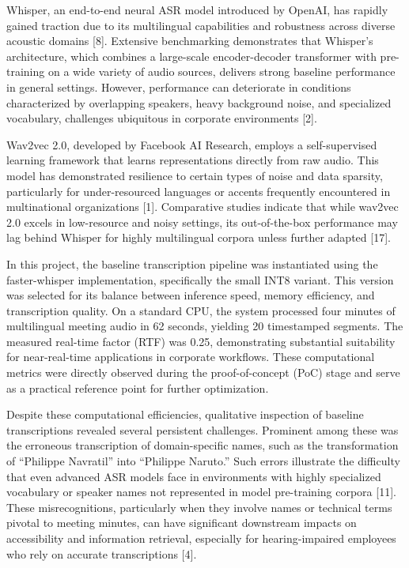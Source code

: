 \documentclass[12pt,a4paper]{article}
\begin{document}
Whisper, an end-to-end neural ASR model introduced by OpenAI, has rapidly gained traction due to its multilingual capabilities and robustness across diverse acoustic domains [8]. Extensive benchmarking demonstrates that Whisper’s architecture, which combines a large-scale encoder-decoder transformer with pre-training on a wide variety of audio sources, delivers strong baseline performance in general settings. However, performance can deteriorate in conditions characterized by overlapping speakers, heavy background noise, and specialized vocabulary, challenges ubiquitous in corporate environments [2].


Wav2vec 2.0, developed by Facebook AI Research, employs a self-supervised learning framework that learns representations directly from raw audio. This model has demonstrated resilience to certain types of noise and data sparsity, particularly for under-resourced languages or accents frequently encountered in multinational organizations [1]. Comparative studies indicate that while wav2vec 2.0 excels in low-resource and noisy settings, its out-of-the-box performance may lag behind Whisper for highly multilingual corpora unless further adapted [17].


In this project, the baseline transcription pipeline was instantiated using the faster-whisper implementation, specifically the small INT8 variant. This version was selected for its balance between inference speed, memory efficiency, and transcription quality. On a standard CPU, the system processed four minutes of multilingual meeting audio in 62 seconds, yielding 20 timestamped segments. The measured real-time factor (RTF) was 0.25, demonstrating substantial suitability for near-real-time applications in corporate workflows. These computational metrics were directly observed during the proof-of-concept (PoC) stage and serve as a practical reference point for further optimization.


Despite these computational efficiencies, qualitative inspection of baseline transcriptions revealed several persistent challenges. Prominent among these was the erroneous transcription of domain-specific names, such as the transformation of “Philippe Navratil” into “Philippe Naruto.” Such errors illustrate the difficulty that even advanced ASR models face in environments with highly specialized vocabulary or speaker names not represented in model pre-training corpora [11]. These misrecognitions, particularly when they involve names or technical terms pivotal to meeting minutes, can have significant downstream impacts on accessibility and information retrieval, especially for hearing-impaired employees who rely on accurate transcriptions [4].
\end{document}
